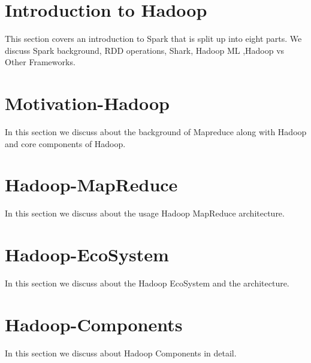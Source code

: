 
\section{Introduction to Hadoop}
\label{c:spark}


This section covers an introduction to Spark that is split up
into eight parts. We discuss Spark background, RDD operations,
Shark, Hadoop ML ,Hadoop vs Other Frameworks.

\section{Motivation-Hadoop}
\label{s:motivation-spark}

In this section we discuss about the background of Mapreduce along with Hadoop and
core components of Hadoop.


\section{Hadoop-MapReduce}

In this section we discuss about the usage Hadoop MapReduce architecture.


\section{Hadoop-EcoSystem}

In this section we discuss about the Hadoop EcoSystem and the architecture. 


\section{Hadoop-Components}

In this section we discuss about Hadoop Components in detail.



